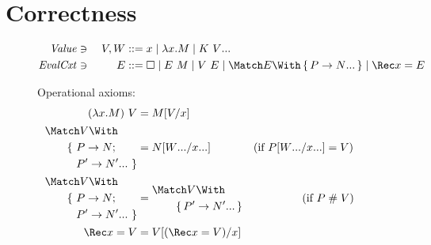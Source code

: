 \documentclass[runningheads]{llncs}
\begin{document}
\section{Correctness}

\begin{figure}
\centering
  
\begin{alignat*}{2}
  \mathit{Value} &\ni{}& V, W
  &::= x
  \mid \lambda x. M
  \mid K~\many{V}
  \\
  \mathit{EvalCxt} &\ni{}& E
  &::= \hole
  \mid E ~ M
  \mid V ~ E
  \mid \Match E \With \set{\many{P \to N}}
  \mid \Rec x = E
\end{alignat*}

Operational axioms:
\begin{align*}
  (\lambda x. M) ~ V
  &=
  M\subst{x}{V}
  \\
  \begin{aligned}
    &\Match V \With \\
    &\qquad
    \begin{aligned}[t]
    \{~ &P \to N; \\
    &\many{P' \to N'}~\}
    \end{aligned}
  \end{aligned}
  &=
  N\subst{\many{x}}{\many{W}}
  &(\text{if } P\subst{\many{x}}{\many{W}} &= V)
  \\
  \begin{aligned}
    &\Match V \With \\
    &\qquad
    \begin{aligned}[t]
    \{~ &P \to N; \\
    &\many{P' \to N'}~\}
    \end{aligned}
  \end{aligned}
  &=
  \begin{aligned}
    &\Match V \With \\
    &\qquad \set{\many{P' \to N'}}
  \end{aligned}
  &(\text{if } P &\apart V)
  \\
  \Rec x = V
  &=
  V\subst{x}{(\Rec x = V)}
\end{align*}


\end{figure}
\end{document}
